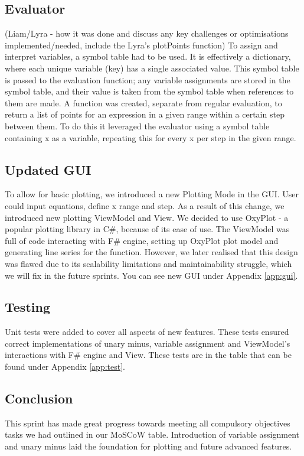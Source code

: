 \documentclass[a4paper, oneside, 11pt]{report}
\begin{document}
\subsection{Evaluator}
(Liam/Lyra - how it was done and discuss any key challenges or optimisations implemented/needed, include the Lyra's plotPoints function)
To assign and interpret variables, a symbol table had to be used. It is effectively a dictionary, where each unique variable (key) has a single associated value. This symbol table is passed to the evaluation function; any variable assignments are stored in the symbol table, and their value is taken from the symbol table when references to them are made.
A function was created, separate from regular evaluation, to return a list of points for an expression in a given range within a certain step between them. To do this it leveraged the evaluator using a symbol table containing x as a variable, repeating this for every x per step in the given range. 

\subsection{Updated GUI}
To allow for basic plotting, we introduced a new Plotting Mode in the GUI. User could input equations, define x range and step. As a result of this change, we introduced new plotting ViewModel and View. We decided to use OxyPlot\cite{Oxyplot} - a popular plotting library in C\#, because of its ease of use. The ViewModel was full of code interacting with F\# engine, setting up OxyPlot plot model and generating line series for the function. However, we later realised that this design was flawed due to its scalability limitations and maintainability struggle, which we will fix in the future sprints. You can see new GUI under Appendix \ref{app:gui}.

\subsection{Testing}
Unit tests were added to cover all aspects of new features. These tests ensured correct implementations of unary minus, variable assignment and ViewModel’s interactions with F\# engine and View. These tests are in the table that can be found under Appendix \ref{app:test}.


\subsection{Conclusion}
This sprint has made great progress towards meeting all compulsory objectives tasks we had outlined in our MoSCoW table. Introduction of variable assignment and unary minus laid the foundation for plotting and future advanced features.
\end{document}
